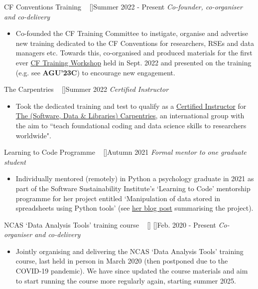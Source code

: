 \begin{projects}

\projecta
	{CF Conventions Training ~ [\href{https://cfconventions.org/Training/}{\small{\websiteSymbol}}]}{Summer 2022 - Present}
	{
	    \textit{Co-founder, co-organiser and co-delivery} ~ 
	}
	{\begin{itemize}
     \item Co-founded the CF Training Committee to instigate, organise and advertise new training dedicated to the CF Conventions for researchers, RSEs and data managers etc. Towards this, co-organised and produced materials for the first ever \href{https://cfconventions.org/Training/2022-Training-Workshop.html}{CF Training Workshop} held in Sept. 2022 and presented on the training (e.g. see \textbf{AGU’23C}) to encourage new engagement.
     \end{itemize}}

\projecta
	{The Carpentries ~ [\href{https://github.com/sadielbartholomew/sadielbartholomew/blob/master/assets/carpentries_instructor_certificate.pdf}{\small{\faCertificate}}]}{Summer 2022}
	{
	    \textit{Certified Instructor}
	}
	{\begin{itemize}
     \item Took the dedicated training and test to qualify as a \href{https://carpentries.org/instructors/}{Certified Instructor} for \href{}{The (Software, Data \& Libraries) Carpentries}, an international group with the aim to ``teach foundational coding and data science skills to researchers worldwide".
     \end{itemize}
     }

\projecta
	{Learning to Code Programme ~ [\href{https://www.software.ac.uk/mentorship-programme/mentorship-programme-2021}{\small{\websiteSymbol}}]}{Autumn 2021}
	{
	    \textit{Formal mentor to one graduate student}
	}
	{\begin{itemize}
     \item Individually mentored (remotely) in Python a psychology graduate in 2021 as part of the Software Sustainability Institute's `Learning to Code' mentorship programme for her project entitled `Manipulation of data stored in spreadsheets using Python tools' (see \href{https://www.software.ac.uk/blog/learning-code-my-experience-psychology-graduate}{her blog post} summarising the project).
     \end{itemize}}

\projecta
	{NCAS `Data Analysis Tools' training course ~ [\href{https://ncas.ac.uk/study-with-us/data-analysis-tools/}{\small{\websiteSymbol}}] [\href{https://github.com/NCAS-CMS/cf-tools-training}{\small{\githubSymbol}}]}{Feb. 2020 - Present}
	{
	    \textit{Co-organiser and co-delivery}
	}
	{\begin{itemize}
     \item Jointly organising and delivering the NCAS `Data Analysis Tools' training course, last held in person in March 2020 (then postponed due to the COVID-19 pandemic). We have since updated the course materials and aim to start running the course more regularly again, starting summer 2025.
     \end{itemize}}


\end{projects}
